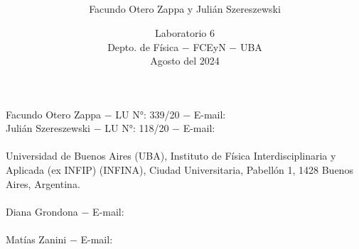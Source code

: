 

\title{\bf {} \\  \\ }
\author{\large Facundo Otero Zappa y Julián Szereszewski}
\date{\vspace{10cm} Laboratorio 6 \\ \vspace{.5cm} Depto. de Física $-$ FCEyN $-$ UBA \\ \vspace{1cm} Agosto del 2024}
\pagestyle{fancy} \fancyhf{}    
\maketitle

\NP

\thispagestyle{plain}

Facundo Otero Zappa $-$ LU N°: 339/20 $-$ E-mail:  \\
Julián Szereszewski $-$ LU N°: 118/20 $-$ E-mail:  \\\\

Universidad de Buenos Aires (UBA), Instituto de Física Interdisciplinaria y Aplicada (ex INFIP) (INFINA), Ciudad Universitaria, Pabellón 1, 1428 Buenos Aires, Argentina. \\\\

Diana Grondona $-$ E-mail:  \\\\

Matías Zanini $-$ E-mail:  \\\\

\vspace{7.5cm}

